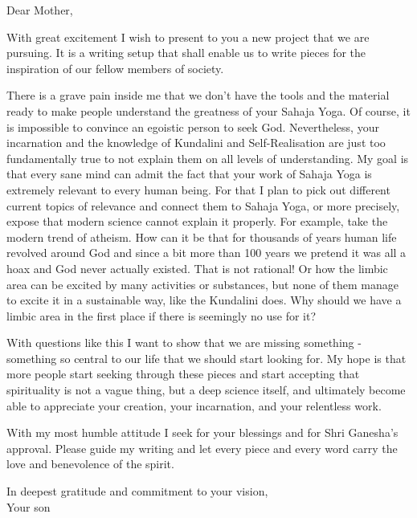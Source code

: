 \documentclass[12pt]{article}
\date{\today}
\begin{document}
\raggedright

{\small\the\year}

\bigskip

Dear Mother,

\bigskip

With great excitement I wish to present to you a new project that we are pursuing.
It is a writing setup that shall enable us to write pieces for the inspiration of our fellow members of society.

There is a grave pain inside me that we don't have the tools and the material ready to make people understand the greatness of your Sahaja Yoga.
Of course, it is impossible to convince an egoistic person to seek God.
Nevertheless, your incarnation and the knowledge of Kundalini and Self-Realisation are just too fundamentally true to not explain them on all levels of understanding.
My goal is that every sane mind can admit the fact that your work of Sahaja Yoga is extremely relevant to every human being.
For that I plan to pick out different current topics of relevance and connect them to Sahaja Yoga, or more precisely, expose that modern science cannot explain it properly.
For example, take the modern trend of atheism.
How can it be that for thousands of years human life revolved around God and since a bit more than 100 years we pretend it was all a hoax and God never actually existed.
That is not rational!
Or how the limbic area can be excited by many activities or substances, but none of them manage to excite it in a sustainable way, like the Kundalini does.
Why should we have a limbic area in the first place if there is seemingly no use for it?

With questions like this I want to show that we are missing something - something so central to our life that we should start looking for.
My hope is that more people start seeking through these pieces and start accepting that spirituality is not a vague thing, but a deep science itself,
and ultimately become able to appreciate your creation, your incarnation, and your relentless work.

With my most humble attitude I seek for your blessings and for Shri Ganesha's approval.
Please guide my writing and let every piece and every word carry the love and benevolence of the spirit.

\bigskip

In deepest gratitude and commitment to your vision, \\
Your son
\end{document}
